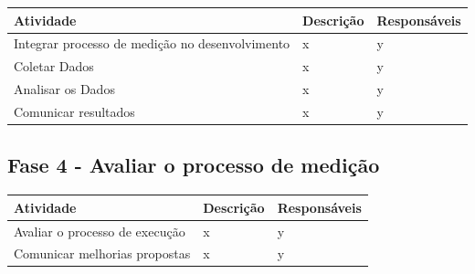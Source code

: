 	\begin{tabular}{ |p{4cm}|p{6cm}| p{3cm} |}
	 \hline
	 Atividade 		& 		Descrição & Responsáveis \\
	 \hline
	 	Integrar processo de medição no desenvolvimento & x &  y \\
	 \hline
	 	Coletar Dados & x &  y \\
	 \hline
	 	Analisar os Dados & x &  y \\
	 \hline
	 	Comunicar resultados & x &  y \\
	 \hline
	\end{tabular}

\subsection{Fase 4 - Avaliar o processo de medição}

	\begin{tabular}{ |p{4cm}|p{6cm}| p{3cm} |}

	 \hline
	 Atividade 		& 		Descrição & Responsáveis \\
	 \hline
	 	Avaliar o processo de execução & x &  y \\
	 \hline
	 	Comunicar melhorias propostas & x &  y \\
	 \hline

	\end{tabular}
